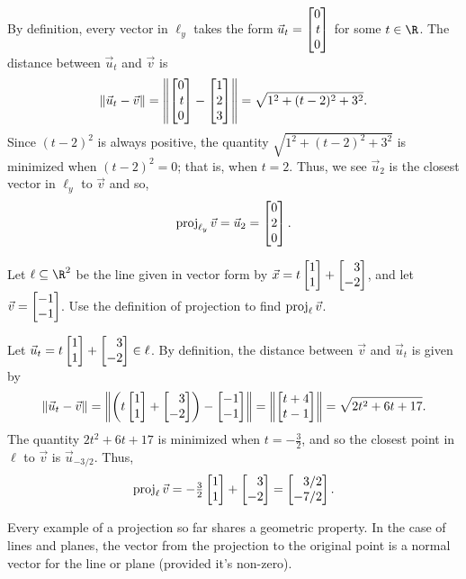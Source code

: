 By definition, every vector in $\ell_y$ takes the form $\vec u_t=\mat{0\\t\\0}$ for some $t\in \R$. The distance
between $\vec u_t$ and $\vec v$ is
\[
	\Norm{\vec u_t-\vec v}=\norm*{\mat{0\\t\\0}-\mat{1\\2\\3}} = \sqrt{1^2+(t-2)^2+3^2}.
\]
Since $(t-2)^2$ is always positive, the quantity $\sqrt{1^2+(t-2)^2+3^2}$ is minimized when $(t-2)^2=0$; that is,
when $t=2$. Thus, we see $\vec u_2$ is the closest vector in $\ell_y$ to $\vec v$ and so,
\[
	\Proj_{\ell_y}\vec v=\vec u_2=\mat{0\\2\\0}.
\]


\begin{example}
	Let $\ell\subseteq \R^2$ be the line given in vector form by $\vec x=t\mat{1\\1}+\mat{3\\-2}$,
	and let $\vec v=\mat{-1\\-1}$. Use the definition of projection to find $\operatorname{proj}_\ell \vec v$.

	Let $\vec u_t=t\mat{1\\1}+\mat{3\\-2}\in\ell$.
	By definition, the distance between $\vec v$ and $\vec u_t$ is given by
	\[
		\Norm{\vec u_t-\vec v}=\norm*{\left(t\mat{1\\1}+\mat{3\\-2}\right)-\mat{-1\\-1}} = \norm*{\mat{t+4\\t-1}}
	    =\sqrt{2t^2+6t+17}.
	\]
	The quantity $2t^2+6t+17$ is minimized when $t=-\frac{3}{2}$, and so the closest point
	in $\ell$ to $\vec v$ is $\vec u_{-3/2}$. Thus,
	\[
	    \Proj_\ell \vec v=-\tfrac{3}{2}\mat{1\\1}+\mat{3\\-2}=\mat{3/2\\-7/2}.
	\]
\end{example}

Every example of a projection so far shares a geometric property. In the case of lines and planes,
the vector from the  projection to the original point is a normal vector for the line or plane (provided it's non-zero).

